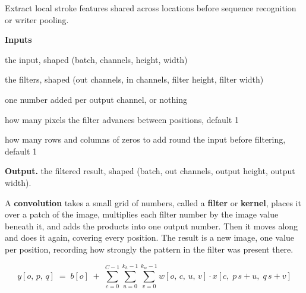 Extract local stroke features shared across locations before sequence recognition or writer pooling.




\noindent\textbf{Inputs}
\begin{description}[leftmargin=2.2em,style=nextline,font=\normalfont\ttfamily]\setlength\itemsep{1pt}
  \item[{x}] \normalfont the input, shaped (batch, channels, height, width)
  \item[{weight}] \normalfont the filters, shaped (out channels, in channels, filter height, filter width)
  \item[{bias}] \normalfont one number added per output channel, or nothing
  \item[{stride}] \normalfont how many pixels the filter advances between positions, default 1
  \item[{padding}] \normalfont how many rows and columns of zeros to add round the input before filtering, default 1
\end{description}

\noindent\textbf{Output.} the filtered result, shaped (batch, out channels, output height, output width).


A \textbf{convolution} takes a small grid of numbers, called a \textbf{filter} or \textbf{kernel}, places it over a patch of the image, multiplies each filter number by the image value beneath it, and adds the products into one output number. Then it moves along and does it again, covering every position. The result is a new image, one value per position, recording how strongly the pattern in the filter was present there.


\begin{equation}
y[o,\,p,\,q] \;=\; b[o] \;+\; \sum_{c=0}^{C-1} \sum_{u=0}^{k_h-1} \sum_{v=0}^{k_w-1} w[o,\,c,\,u,\,v] \cdot x[c,\;p\,s+u,\;q\,s+v]
\end{equation}


